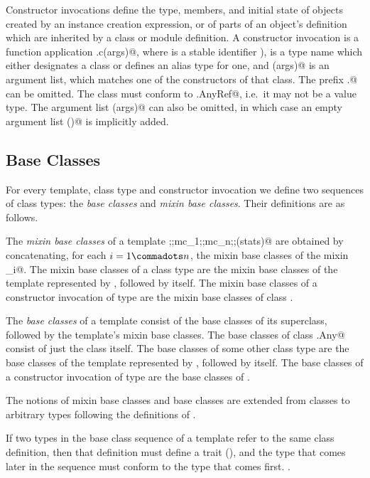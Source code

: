 \documentclass[11pt]{report}
\begin{document}
Constructor invocations define the type, members, and initial state of
objects created by an instance creation expression, or of parts of an
object's definition which are inherited by a class or module
definition. A constructor invocation is a function application
\verb@x.c(args)@, where \verb@x@ is a stable identifier
), \verb@c@ is a type name which either
designates a class or defines an alias type for one, and \verb@(args)@
is an argument list, which matches one of the constructors of that
class. The prefix \verb@x.@ can be omitted. The class \verb@c@ must
conform to \verb@scala.AnyRef@, i.e.\ it may not be a value type.  The
argument list \verb@(args)@ can also be omitted, in which case an
empty argument list \verb@()@ is implicitly added.

\subsection{Base Classes}
\label{sec:base-classes}

For every template, class type and constructor invocation we define two
sequences of class types: the {\em base classes} and {\em mixin base
classes}. Their definitions are as follows.

The {\em mixin base classes} of a template
\verb@sc;\WITH;mc_1;\WITH;mc_n;\WITH;(stats)@ are obtained by
concatenating, for each $i = 1 \commadots n$, the mixin base classes
of the mixin \verb@mc_i@. The mixin base classes of a class type \verb@C@ are
the mixin base classes of the template represented by \verb@C@, followed by
\verb@C@ itself. The mixin base classes of a constructor invocation of type
\verb@T@ are the mixin base classes of class \verb@T@.

The {\em base classes} of a template consist of the base classes of
its superclass, followed by the template's mixin base classes.  The
base classes of class \verb@scala.Any@ consist of just the
class itself. The base classes of some other class type \verb@C@ are the
base classes of the template represented by \verb@C@, followed by \verb@C@
itself.  The base classes of a constructor invocation of type \verb@T@
are the base classes of \verb@T@.

The notions of mixin base classes and base classes are extended from
classes to arbitrary types following the definitions of
.
 
If two types in the base class sequence of a template refer to the
same class definition, then that definition must define a trait
(), and the type that comes later in the sequence must
conform to the type that comes first. 
.
\end{document}
